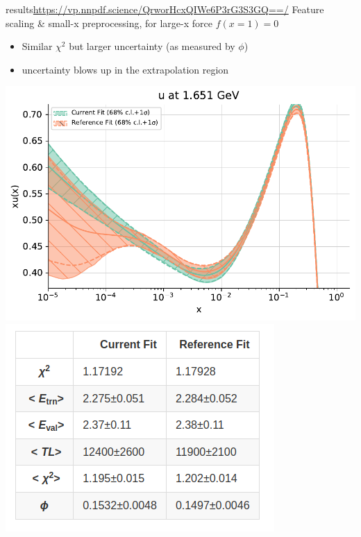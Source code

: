 \documentclass[aspectratio=169, 8pt,t]{beamer}
\begin{document}
\begin{frame}{results}{\url{https://vp.nnpdf.science/QrworHcxQIWe6P3rG3S3GQ==/}}
  Feature scaling \& small-x preprocessing, for large-x force $f(x=1)=0$

  \begin{itemize}
    \item Similar $\chi^2$ but larger uncertainty (as measured by $\phi$)
    \item uncertainty blows up in the extrapolation region
  \end{itemize}

  \begin{center}
    \includegraphics[height=0.55\textheight]{pdf_u_nolargexpreproc_featurescalign.pdf}
    \includegraphics[height=0.55\textheight]{onlysmallxperproc_featurescaling_summary.png}
  \end{center}

\end{frame}
\end{document}
